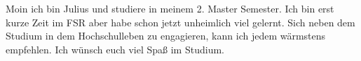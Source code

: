 \begin{multicols}{2}
{
Moin ich bin Julius und studiere in meinem 2. Master Semester. Ich bin erst kurze Zeit im FSR aber habe schon jetzt unheimlich viel gelernt. Sich neben dem Studium in dem Hochschulleben zu engagieren, kann ich jedem wärmstens empfehlen. Ich wünsch euch viel Spaß im Studium.
}







%
%
%
%




\end{multicols}

